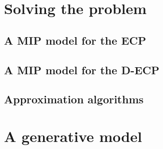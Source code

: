 \section{Solving the problem}%
\label{sec:solving_the_problem}

\subsection{A MIP model for the ECP}%
\label{sub:a_mip_model_for_the_ecp}

\subsection{A MIP model for the D-ECP}%
\label{sub:a_mip_model_for_the_ecp}

\subsection{Approximation algorithms}%
\label{sub:approximation_algorithms}

\section{A generative model}%
\label{sec:generative_model}



